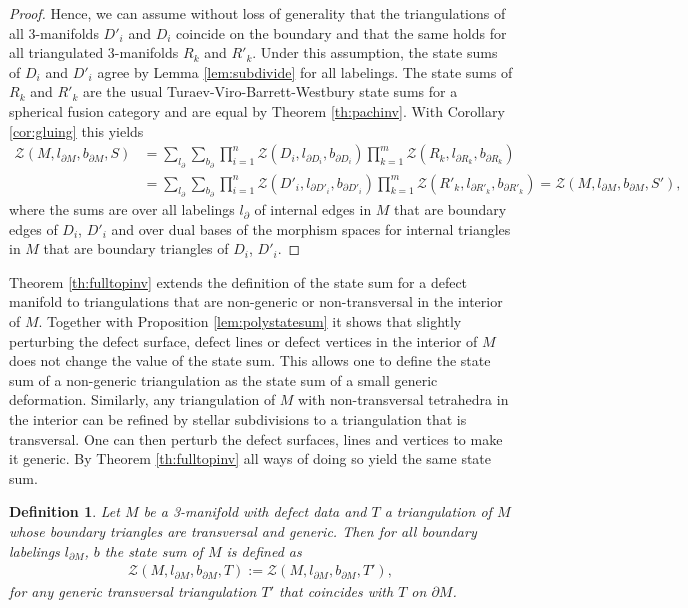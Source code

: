 \documentclass[1.5pt, a4paper]{article}
\newtheorem{definition}[theorem]{Definition}
\begin{document}
\begin{proof}
Hence, we can assume without loss of generality that the triangulations of all 3-manifolds $D'_i$ and $D_i$ coincide on the boundary and that the same holds for all  triangulated 3-manifolds $R_k$ and $R'_k$.  
  Under this assumption, the state sums of $D_i$ and $D'_i$  agree by Lemma \ref{lem:subdivide} for
 all labelings. 
 The state sums of $R_k$ and $R'_k$ are the usual Turaev-Viro-Barrett-Westbury state sums for a  spherical fusion category and are equal by Theorem \ref{th:pachinv}. 
 With Corollary \ref{cor:gluing} this yields 
 \begin{align*}
\mathcal Z(M, l_{\partial M}, b_{\partial M}, S)&=\sum_{l_{\partial}}\sum_{b_\partial}  \prod_{i=1}^n\mathcal Z(D_i, l_{\partial D_i}, b_{\partial D_i})\prod_{k=1}^m  \mathcal Z(R_k, l_{\partial R_k}, b_{\partial R_k})\\
&=\sum_{l_{\partial}}\sum_{b_\partial}  \prod_{i=1}^n\mathcal Z(D'_i, l_{\partial D'_i}, b_{\partial D'_i})\prod_{k=1}^m  \mathcal Z(R'_k, l_{\partial R'_k}, b_{\partial R'_k})=\mathcal Z(M, l_{\partial M}, b_{\partial M}, S'),
 \end{align*}
 where the sums are over all labelings $l_\partial$ of internal edges in $M$ that are boundary edges of  $D_i$, $D'_i$ and over dual bases of the morphism spaces for internal triangles  in $M$ that are boundary triangles of  $D_i$, $D'_i$. 
\end{proof}




Theorem \ref{th:fulltopinv}  extends the definition of the state sum for a defect manifold to triangulations that are non-generic or non-transversal in the interior of $M$.  
Together with Proposition \ref{lem:polystatesum} it shows that slightly perturbing the defect surface, defect lines or defect vertices in the interior of $M$ does not change the value of the state sum. This allows one to define the state sum of a non-generic triangulation as the state sum of a small generic deformation.
Similarly, any triangulation of $M$ with non-transversal tetrahedra in the interior can be refined 
 by  stellar subdivisions to a triangulation that is transversal. 
 One can then perturb the defect surfaces, lines and vertices  to make it generic. 
  By Theorem \ref{th:fulltopinv}  all ways of doing so yield the same  state sum. 



\begin{definition} Let $M$ be a 3-manifold with defect data and $T$ a triangulation of $M$ whose boundary triangles are transversal and generic. Then for all boundary labelings $l_{\partial M}$,  $b$   the state sum of $M$ is  defined as
\begin{align}
\mathcal Z(M,l_{\partial M},b_{\partial M}, T):=\mathcal Z(M,l_{\partial M}, b_{\partial M}, T'),
\end{align}
for any generic transversal triangulation $T'$ that coincides with $T$ on $\partial M$.
\end{definition}
\end{document}
